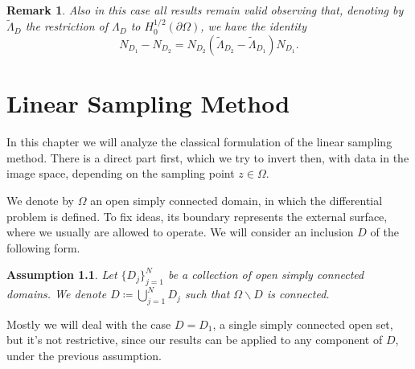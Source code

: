\documentclass[10pt, a4paper, twoside, openright]{book}
\theoremstyle{definition}
\theoremstyle{plain}
\theoremstyle{plain}
\theoremstyle{plain}
\theoremstyle{plain}
\newtheorem{remark}[subsection]{Remark}
\theoremstyle{plain}
\theoremstyle{plain}
\theoremstyle{plain}
\newtheorem{assumption}[subsection]{Assumption}
\theoremstyle{plain}
\begin{document}
\begin{remark}
Also in this case all results remain valid observing  that, denoting by $\tilde\Lambda_D$ the restriction of 
$\Lambda_D$ to $H_0^{1/2}(\partial\Omega)$, we have the identity
$$N_{D_1}-N_{D_2}=N_{D_2}(\tilde\Lambda_{D_2}-\tilde\Lambda_{D_1})N_{D_1}.$$
\end{remark}


\chapter{Linear Sampling Method}
\label{ch:linear-sampling}
\begin{figure}[tb]
\begin{center}
\end{center}
\end{figure}
In this chapter we will analyze the classical formulation of the linear sampling method. 
There is a direct part first, which we try to invert then, with data in the image space, 
depending on the sampling point $z\in\Omega$.
\par
We denote by $\Omega$ an open simply connected domain, in which the differential problem is defined.
To fix ideas, its boundary represents the external surface, where we usually are allowed to operate.
We will consider an inclusion $D$ of the following form.
\begin{assumption}
\label{assumption:connected}
 Let $\bigl\{D_j\bigr\}_{j=1}^N$ be a collection of open simply connected domains.
 We denote $D\coloneqq\bigcup_{j=1}^ND_j$ such that $\Omega\backslash D$ is connected.
\end{assumption}
Mostly we will deal with the case $D=D_1$, a single simply connected open set, but it's not restrictive, 
since our results can be applied to any component of $D$, under the previous assumption.
\end{document}
